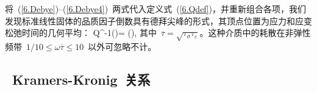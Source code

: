 将~(\ref{6.Debye})--(\ref{6.Debye4})~两式代入定义式~(\ref{6.Qdef})，并重新组合各项，我们发现标准线性固体的品质因子倒数具有德拜尖峰的形式，其顶点位置为应力和应变松弛时间的几何平均：
\eq
Q^{-1}(\omega)=
\left(\right),
\en
其中~$\overline{\tau}=\sqrt{\tau_{\sigma}\tau_{\varepsilon}}$。这种介质中的耗散在非弹性频带~$1/10\leq\omega\overline{\tau}\leq 10$~以外可忽略不计。
%
%
%
%

\renewcommand{\thesubsection}{$\!\!\!\raise1.3ex\hbox{$\star$}\!\!$
\arabic{chapter}.\arabic{section}.\arabic{subsection}}
\subsection{~Kramers-Kronig~关系}
%
\renewcommand{\thesubsection}{\arabic{chapter}.\arabic{section}.\arabic{subsection}}

